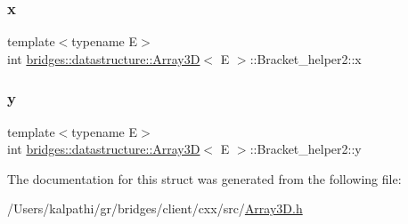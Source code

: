\subsubsection{\texorpdfstring{x}{x}}
{\footnotesize\ttfamily template$<$typename E$>$ \\
int \mbox{\hyperlink{classbridges_1_1datastructure_1_1_array3_d}{bridges\+::datastructure\+::\+Array3D}}$<$ E $>$\+::Bracket\+\_\+helper2\+::x}

\mbox{\label{structbridges_1_1datastructure_1_1_array3_d_1_1_bracket__helper2_a2bd3e3e4253b14e14f1803b49d2f6dca}} 
\subsubsection{\texorpdfstring{y}{y}}
{\footnotesize\ttfamily template$<$typename E$>$ \\
int \mbox{\hyperlink{classbridges_1_1datastructure_1_1_array3_d}{bridges\+::datastructure\+::\+Array3D}}$<$ E $>$\+::Bracket\+\_\+helper2\+::y}



The documentation for this struct was generated from the following file\+:\begin{DoxyCompactItemize}
\item 
/\+Users/kalpathi/gr/bridges/client/cxx/src/\mbox{\hyperlink{_array3_d_8h}{Array3\+D.\+h}}\end{DoxyCompactItemize}
